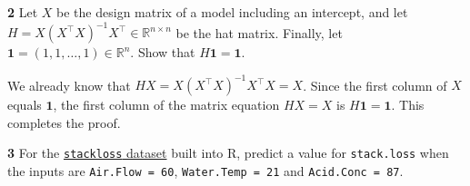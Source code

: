 \documentclass[
  a4paper,
]{article}
\theoremstyle{definition}
\theoremstyle{definition}
\theoremstyle{definition}
\theoremstyle{definition}
\theoremstyle{remark}
\begin{document}
\textbf{2} Let \(X\) be the design matrix of a model including an intercept, and
let \(H = X (X^\top X)^{-1} X^\top \in\mathbb{R}^{n\times n}\) be the hat matrix.
Finally, let \(\mathbf{1} = (1, 1, \ldots, 1) \in\mathbb{R}^n\).
Show that \(H \mathbf{1} = \mathbf{1}\).

\begin{myanswers}
We already know that \(H X = X (X^\top X)^{-1} X^\top X = X\). Since
the first column of \(X\) equals \(\mathbf{1}\), the first column of
the matrix equation \(HX = X\) is \(H\mathbf{1} = \mathbf{1}\). This
completes the proof.

\end{myanswers}

\textbf{3} For the \href{https://rdrr.io/r/datasets/stackloss.html}{\texttt{stackloss} dataset}
built into R, predict a value for \texttt{stack.loss} when the inputs are
\texttt{Air.Flow\ =\ 60}, \texttt{Water.Temp\ =\ 21} and \texttt{Acid.Conc\ =\ 87}.
\end{document}
